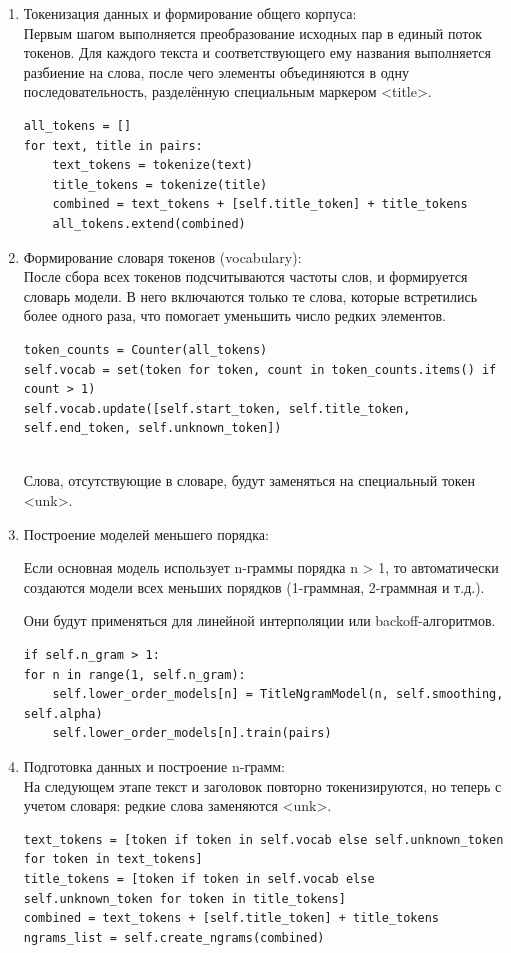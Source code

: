 \documentclass[coursework]{SCWorks}
\begin{document}
    \begin{enumerate}
        \item Токенизация данных и формирование общего корпуса: \\
        Первым шагом выполняется преобразование исходных пар в единый поток токенов.
        Для каждого текста и соответствующего ему названия выполняется разбиение на слова, после чего элементы объединяются
        в одну последовательность, разделённую специальным маркером <title>.
        \begin{verbatim}
all_tokens = []
for text, title in pairs:
    text_tokens = tokenize(text)
    title_tokens = tokenize(title)
    combined = text_tokens + [self.title_token] + title_tokens
    all_tokens.extend(combined)
        \end{verbatim}

        \item Формирование словаря токенов (vocabulary): \\
        После сбора всех токенов подсчитываются частоты слов, и формируется словарь модели.
        В него включаются только те слова, которые встретились более одного раза, что помогает уменьшить число редких элементов.
        \begin{verbatim}
token_counts = Counter(all_tokens)
self.vocab = set(token for token, count in token_counts.items() if count > 1)
self.vocab.update([self.start_token, self.title_token, self.end_token, self.unknown_token])
        \end{verbatim} \\
        Слова, отсутствующие в словаре, будут заменяться на специальный токен <unk>.

        \item Построение моделей меньшего порядка:

        Если основная модель использует n-граммы порядка n > 1, то автоматически создаются модели всех меньших порядков (1-граммная, 2-граммная и т.д.).

        Они будут применяться для линейной интерполяции или backoff-алгоритмов.

        \begin{verbatim}
if self.n_gram > 1:
for n in range(1, self.n_gram):
    self.lower_order_models[n] = TitleNgramModel(n, self.smoothing, self.alpha)
    self.lower_order_models[n].train(pairs)
        \end{verbatim}

        \item Подготовка данных и построение n-грамм: \\
        На следующем этапе текст и заголовок повторно токенизируются, но теперь с учетом словаря: редкие слова заменяются <unk>.
        \begin{verbatim}
text_tokens = [token if token in self.vocab else self.unknown_token for token in text_tokens]
title_tokens = [token if token in self.vocab else self.unknown_token for token in title_tokens]
combined = text_tokens + [self.title_token] + title_tokens
ngrams_list = self.create_ngrams(combined)
        \end{verbatim}


\end{enumerate}
\end{document}
